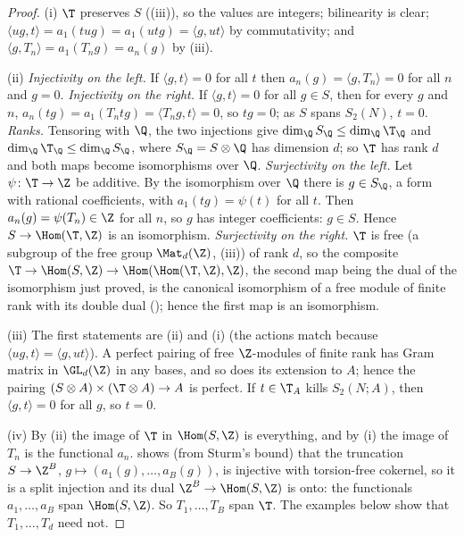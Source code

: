 \begin{proof}
(i) $\T$ preserves $S$ ((iii)), so the values are integers; bilinearity is clear; $\langle ug,t\rangle=a_1(tug)=a_1(utg)=\langle g,ut\rangle$ by commutativity;
and $\langle g,T_n\rangle=a_1(T_ng)=a_n(g)$ by (iii).

(ii) \emph{Injectivity on the left.} If $\langle g,t\rangle=0$ for all $t$ then $a_n(g)=\langle g,T_n\rangle=0$ for all $n$ and $g=0$. \emph{Injectivity on the right.} If $\langle g,t\rangle=0$ for all $g\in S$,
then for every $g$ and $n$, $a_n(tg)=a_1(T_ntg)=\langle T_ng,t\rangle=0$, so $tg=0$; as $S$ spans $S_2(N)$, $t=0$. \emph{Ranks.} Tensoring with $\Q$, the two injections give
$\dim_\Q S_\Q\le\dim_\Q\T_\Q$ and $\dim_\Q\T_\Q\le\dim_\Q S_\Q$, where $S_\Q=S\otimes\Q$ has dimension $d$; so $\T$ has rank $d$ and both maps become isomorphisms over $\Q$.
\emph{Surjectivity on the left.} Let $\psi\colon\T\to\Z$ be additive. By the isomorphism over $\Q$ there is $g\in S_\Q$, a form with rational coefficients, with $a_1(tg)=\psi(t)$ for all
$t$. Then $a_n(g)=\psi(T_n)\in\Z$ for all $n$, so $g$ has integer coefficients: $g\in S$. Hence $S\to\Hom(\T,\Z)$ is an isomorphism. \emph{Surjectivity on the right.} $\T$ is free (a subgroup of the free group $\Mat_d(\Z)$,
(iii)) of rank $d$, so the composite $\T\to\Hom(S,\Z)\to\Hom(\Hom(\T,\Z),\Z)$, the second map
being the dual of the isomorphism just proved, is the canonical isomorphism of a free module of finite rank with its double dual (); hence the first
map is an isomorphism.

(iii) The first statements are (ii) and (i) (the actions match because $\langle ug,t\rangle=\langle g,ut\rangle$). A perfect pairing of free $\Z$-modules of finite rank has Gram matrix in
$\GL_d(\Z)$ in any bases, and so does its extension to $A$; hence the pairing $(S\otimes A)\times(\T\otimes A)\to A$ is perfect. If $t\in\T_A$ kills $S_2(N;A)$, then $\langle g,t\rangle=0$ for
all $g$, so $t=0$.

(iv) By (ii) the image of $\T$ in $\Hom(S,\Z)$ is everything, and by (i) the image of $T_n$ is the functional $a_n$.  shows (from Sturm's bound) that
the truncation $S\to\Z^B$, $g\mapsto(a_1(g),\dots,a_B(g))$, is injective with torsion-free cokernel, so it is a split injection and its dual $\Z^B\to\Hom(S,\Z)$ is onto: the functionals
$a_1,\dots,a_B$ span $\Hom(S,\Z)$. So $T_1,\dots,T_B$ span $\T$. The examples below show that $T_1,\dots,T_d$ need not.
\end{proof}

